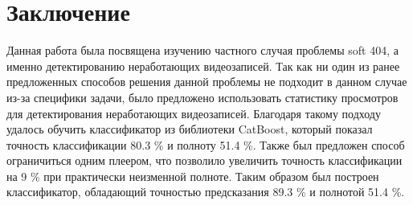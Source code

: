 
\chapter{Заключение}

Данная работа была посвящена изучению частного случая проблемы soft 404, а именно детектированию неработающих видеозаписей. Так как ни один из ранее предложенных способов решения данной проблемы не подходит в данном случае из-за специфики задачи, было предложено использовать статистику просмотров для детектирования неработающих видеозаписей. Благодаря такому подходу удалось обучить классификатор из библиотеки CatBoost, который показал точность классификации 80.3 \% и полноту 51.4 \%. Также был предложен способ ограничиться одним плеером, что позволило увеличить точность классификации на 9 \% при практически неизменной полноте. Таким образом был построен классификатор, обладающий точностью предсказания 89.3 \% и полнотой 51.4 \%.